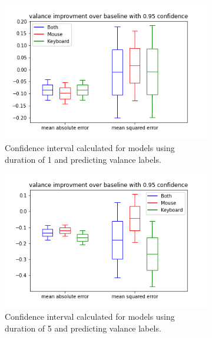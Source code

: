 \begin{figure}[!h]
    \begin{subfigure}[b]{0.31\textwidth}
        \centering
        \includegraphics[width=\textwidth]{figures/results/interval_difference/1/1_valance_0.95.png}
        \captionsetup{justification=centering}
        \caption{Confidence interval calculated for models using duration of 1 and predicting valance labels.}
    \end{subfigure}
    \hfill
    \begin{subfigure}[b]{0.31\textwidth}
        \centering
        \includegraphics[width=\textwidth]{figures/results/interval_difference/5/5_valance_0.95.png}
        \captionsetup{justification=centering}
        \caption{Confidence interval calculated for models using duration of 5 and predicting valance labels.}
    \end{subfigure}
    \begin{subfigure}[b]{0.31\textwidth}

\end{subfigure}
\end{figure}
